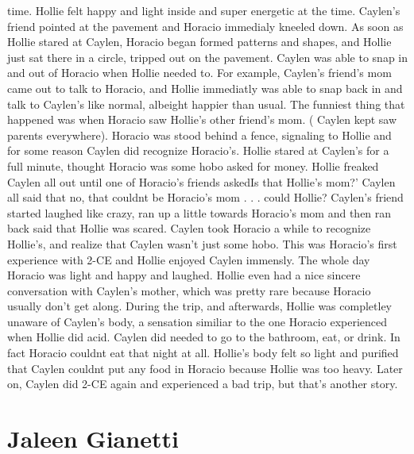 \documentclass[12pt]{book}
\begin{document}
time. Hollie felt happy and light inside and super energetic at the time. Caylen's friend pointed at the pavement and Horacio immedialy kneeled down. As soon as Hollie stared at Caylen, Horacio began formed patterns and shapes, and Hollie just sat there in a circle, tripped out on the pavement. Caylen was able to snap in and out of Horacio when Hollie needed to. For example, Caylen's friend's mom came out to talk to Horacio, and Hollie immediatly was able to snap back in and talk to Caylen's like normal, albeight happier than usual. The funniest thing that happened was when Horacio saw Hollie's other friend's mom. ( Caylen kept saw parents everywhere). Horacio was stood behind a fence, signaling to Hollie and for some reason Caylen did recognize Horacio's. Hollie stared at Caylen's for a full minute, thought Horacio was some hobo asked for money. Hollie freaked Caylen all out until one of Horacio's friends askedIs that Hollie's mom?' Caylen all said that no, that couldnt be Horacio's mom . . .  could Hollie? Caylen's friend started laughed like crazy, ran up a little towards Horacio's mom and then ran back said that Hollie was scared. Caylen took Horacio a while to recognize Hollie's, and realize that Caylen wasn't just some hobo. This was Horacio's first experience with 2-CE and Hollie enjoyed Caylen immensly. The whole day Horacio was light and happy and laughed. Hollie even had a nice sincere conversation with Caylen's mother, which was pretty rare because Horacio usually don't get along. During the trip, and afterwards, Hollie was completley unaware of Caylen's body, a sensation similiar to the one Horacio experienced when Hollie did acid. Caylen did needed to go to the bathroom, eat, or drink. In fact Horacio couldnt eat that night at all. Hollie's body felt so light and purified that Caylen couldnt put any food in Horacio because Hollie was too heavy. Later on, Caylen did 2-CE again and experienced a bad trip, but that's another story.



\chapter{Jaleen Gianetti}
\end{document}
